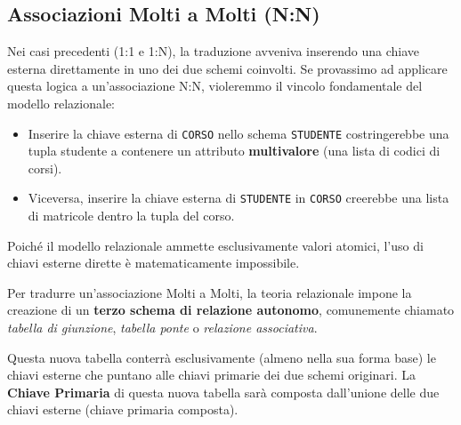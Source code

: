 \subsection{Associazioni Molti a Molti (N:N)}

Nei casi precedenti (1:1 e 1:N), la traduzione avveniva inserendo una chiave esterna direttamente in uno dei due schemi coinvolti. 
Se provassimo ad applicare questa logica a un'associazione N:N, violeremmo il vincolo fondamentale del modello relazionale:
\begin{itemize}
    \item Inserire la chiave esterna di \texttt{CORSO} nello schema \texttt{STUDENTE} costringerebbe una tupla studente a contenere un attributo \textbf{multivalore} (una lista di codici di corsi).
    \item Viceversa, inserire la chiave esterna di \texttt{STUDENTE} in \texttt{CORSO} creerebbe una lista di matricole dentro la tupla del corso.
\end{itemize}
Poiché il modello relazionale ammette esclusivamente valori atomici, l'uso di chiavi esterne dirette è matematicamente impossibile.

\medskip

Per tradurre un'associazione Molti a Molti, la teoria relazionale impone la creazione di un \textbf{terzo schema di relazione autonomo}, comunemente chiamato \textit{tabella di giunzione}, \textit{tabella ponte} o \textit{relazione associativa}.

Questa nuova tabella conterrà esclusivamente (almeno nella sua forma base) le chiavi esterne che puntano alle chiavi primarie dei due schemi originari. La \textbf{Chiave Primaria} di questa nuova tabella sarà composta dall'unione delle due chiavi esterne (chiave primaria composta).

